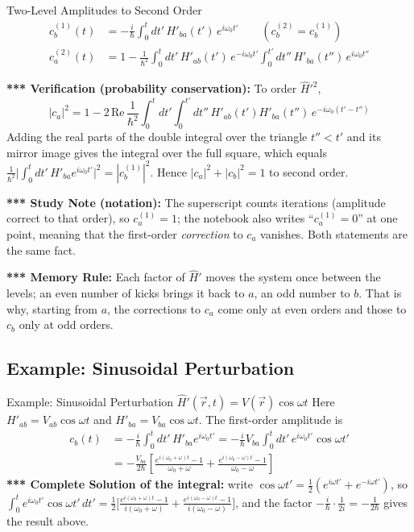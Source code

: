 \documentclass[11pt,a4paper]{article}
\begin{document}
\begin{thm}{Two-Level Amplitudes to Second Order}
\begin{align*}
c_b^{(1)}(t) &= -\frac i\hbar\int_0^tdt'\,H'_{ba}(t')\,e^{i\omega_0t'} \qquad (c_b^{(2)}=c_b^{(1)})\\
c_a^{(2)}(t) &= 1-\frac1{\hbar^2}\int_0^tdt'\,H'_{ab}(t')\,e^{-i\omega_0t'}\int_0^{t'}dt''\,H'_{ba}(t'')\,e^{i\omega_0t''}
\end{align*}
\end{thm}

\textbf{*** Verification (probability conservation):} To order $\hat H'^2$,
\[
|c_a|^2 = 1-2\,\mathrm{Re}\,\frac1{\hbar^2}\int_0^tdt'\int_0^{t'}dt''\,H'_{ab}(t')H'_{ba}(t'')\,e^{-i\omega_0(t'-t'')}
\]
Adding the real parts of the double integral over the triangle $t''<t'$ and its mirror image gives the integral over the full square, which equals $\frac1{\hbar^2}\big|\int_0^tdt'\,H'_{ba}e^{i\omega_0t'}\big|^2=|c_b^{(1)}|^2$. Hence $|c_a|^2+|c_b|^2=1$ to second order.

\textbf{*** Study Note (notation):} The superscript counts iterations (amplitude correct to that order), so $c_a^{(1)}=1$; the notebook also writes ``$c_a^{(1)}=0$'' at one point, meaning that the first-order \textit{correction} to $c_a$ vanishes. Both statements are the same fact.

\textbf{*** Memory Rule:} Each factor of $\hat H'$ moves the system once between the levels; an even number of kicks brings it back to $a$, an odd number to $b$. That is why, starting from $a$, the corrections to $c_a$ come only at even orders and those to $c_b$ only at odd orders.

\subsection{Example: Sinusoidal Perturbation}
\begin{prob}{Example: Sinusoidal Perturbation $\hat H'(\vec r,t)=V(\vec r)\cos\omega t$}
Here $H'_{ab}=V_{ab}\cos\omega t$ and $H'_{ba}=V_{ba}\cos\omega t$. The first-order amplitude is
\begin{align*}
c_b(t) &= -\frac i\hbar\int_0^tdt'\,H'_{ba}e^{i\omega_0t'} = -\frac i\hbar V_{ba}\int_0^tdt'\,e^{i\omega_0t'}\cos\omega t'\\
&= -\frac{V_{ba}}{2\hbar}\left[\frac{e^{i(\omega_0+\omega)t}-1}{\omega_0+\omega} + \frac{e^{i(\omega_0-\omega)t}-1}{\omega_0-\omega}\right]
\end{align*}
\textbf{*** Complete Solution of the integral:} write $\cos\omega t'=\tfrac12(e^{i\omega t'}+e^{-i\omega t'})$, so $\int_0^t e^{i\omega_0t'}\cos\omega t'\,dt' = \tfrac12\Big[\frac{e^{i(\omega_0+\omega)t}-1}{i(\omega_0+\omega)}+\frac{e^{i(\omega_0-\omega)t}-1}{i(\omega_0-\omega)}\Big]$, and the factor $-\frac i\hbar\cdot\frac1{2i}=-\frac1{2\hbar}$ gives the result above.
\end{prob}
\end{document}
